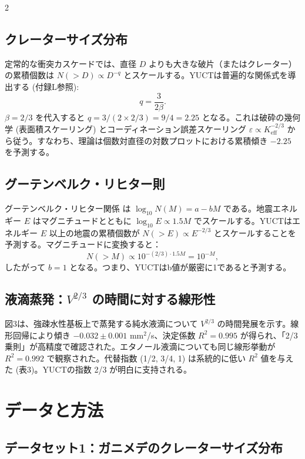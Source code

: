 \documentclass[11pt,a4paper]{article}
\newcommand{\eps}{\varepsilon}
\newcommand{\Keff}{K_{\mathrm{eff}}}
\newcommand{\betaf}{\beta}
\begin{document}
\begin{multicols}{2}
		\subsection{クレーターサイズ分布}
		
		定常的な衝突カスケードでは、直径 \(D\) よりも大きな破片（またはクレーター）の累積個数は \(N(>D) \propto D^{-q}\) とスケールする。YUCTは普遍的な関係式を導出する (付録L参照):
		\[
		q = \frac{3}{2\betaf}.
		\]
		\(\betaf = 2/3\) を代入すると \(q = 3/(2 \times 2/3) = 9/4 = 2.25\) となる。これは破砕の幾何学 (表面積スケーリング) とコーディネーション誤差スケーリング \(\eps \propto \Keff^{-2/3}\) から従う。すなわち、理論は個数対直径の対数プロットにおける累積傾き \(-2.25\) を予測する。
		
		\subsection{グーテンベルク・リヒター則}
		
		グーテンベルク・リヒター関係 \cite{GutenbergRichter1954} は \(\log_{10} N(M) = a - b M\) である。地震エネルギー \(E\) はマグニチュードとともに \(\log_{10} E \propto 1.5 M\) でスケールする。YUCTはエネルギー \(E\) 以上の地震の累積個数が \(N(>E) \propto E^{-2/3}\) とスケールすることを予測する。マグニチュードに変換すると：
		\[
		N(>M) \propto 10^{-(2/3) \cdot 1.5 M} = 10^{-M},
		\]
		したがって \(b = 1\) となる。つまり、YUCTはb値が厳密に1であると予測する。
		
		\subsection{液滴蒸発：\(V^{2/3}\) の時間に対する線形性}
		
		図3は、強疎水性基板上で蒸発する純水液滴について \(V^{2/3}\) の時間発展を示す。線形回帰により傾き \(-0.032 \pm 0.001\) mm\(^2\)/s、決定係数 \(R^2 = 0.995\) が得られ、「2/3乗則」が高精度で確認された。エタノール液滴についても同じ線形挙動が \(R^2 = 0.992\) で観察された。代替指数 (1/2, 3/4, 1) は系統的に低い \(R^2\) 値を与えた (表3)。YUCTの指数 2/3 が明白に支持される。
		
		\section{データと方法}
		
		\subsection{データセット1：ガニメデのクレーターサイズ分布}
		

\end{multicols}
\end{document}
